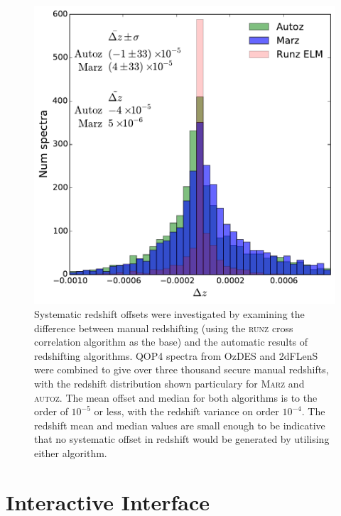\documentclass[iop]{emulateapj}
\newcommand{\runz}{\textsc{runz}}
\newcommand{\autoz}{\textsc{autoz}}
\newcommand{\marz}{\textsc{Marz}}
\begin{document}
\begin{figure}[h]
\centering
\includegraphics[width=\columnwidth]{systematic.pdf}
\caption{Systematic redshift offsets were investigated by examining the difference between manual redshifting (using the \runz{} cross correlation algorithm as the base) and the automatic results of redshifting algorithms. QOP4 spectra from OzDES and 2dFLenS were combined to give over three thousand secure manual redshifts, with the redshift distribution shown particulary for \marz{} and \autoz{}. The mean offset and median for both algorithms is to the order of $10^{-5}$ or less, with the redshift variance on order $10^{-4}$. The redshift mean and median values are small enough to be indicative that no systematic offset in redshift would be generated by utilising either algorithm.}
\label{fig:systematic}
\end{figure}


















\section{Interactive Interface}
\end{document}

